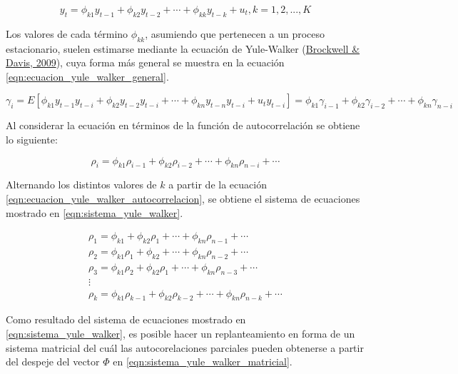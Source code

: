 \documentclass[
]{article}
\begin{document}
\begin{equation}
\label{eqn:ecuacion_autocorrelaciones}
y_t=\phi_{k1}y_{t-1}+\phi_{k2}y_{t-2}+\cdots+\phi_{kk}y_{t-k}+u_t,k=1,2,...,K
\end{equation}

Los valores de cada término \(\phi_{kk}\), asumiendo que pertenecen a un
proceso estacionario, suelen estimarse mediante la ecuación de
Yule-Walker (\protect\hyperlink{ref-yule.walker}{Brockwell \& Davis,
2009}), cuya forma más general se muestra en la ecuación
\ref{eqn:ecuacion_yule_walker_general}.

\begin{equation}
\label{eqn:ecuacion_yule_walker_general}
\gamma_i=E\left[ \phi_{k1}y_{t-1}y_{t-i} + \phi_{k2}y_{t-2}y_{t-i} + \cdots + \phi_{kn}y_{t-n}y_{t-i} + u_ty_{t-i} \right]=\phi_{k1}\gamma_{i-1} + \phi_{k2}\gamma_{i-2} + \cdots + \phi_{kn}\gamma_{n-i}
\end{equation}

Al considerar la ecuación en términos de la función de autocorrelación
se obtiene lo siguiente:

\begin{equation}
\label{eqn:ecuacion_yule_walker_autocorrelacion}
\rho_i=\phi_{k1}\rho_{i-1} + \phi_{k2}\rho_{i-2} + \cdots + \phi_{kn}\rho_{n-i}+\cdots
\end{equation}

Alternando los distintos valores de \(k\) a partir de la ecuación
\ref{eqn:ecuacion_yule_walker_autocorrelacion}, se obtiene el sistema de
ecuaciones mostrado en \ref{eqn:sistema_yule_walker}.

\begin{equation}
\label{eqn:sistema_yule_walker}
\begin{array}{lll} 
\rho_1=\phi_{k1} + \phi_{k2}\rho_{1} + \cdots + \phi_{kn}\rho_{n-1}+\cdots \\
\rho_2=\phi_{k1}\rho_{1} + \phi_{k2} + \cdots + \phi_{kn}\rho_{n-2}+\cdots \\
\rho_3=\phi_{k1}\rho_{2} + \phi_{k2}\rho_{1} + \cdots + \phi_{kn}\rho_{n-3}+\cdots \\
\vdots \\
\rho_k=\phi_{k1}\rho_{k-1} + \phi_{k2}\rho_{k-2} + \cdots + \phi_{kn}\rho_{n-k}+\cdots
\end{array}
\end{equation}

Como resultado del sistema de ecuaciones mostrado en
\ref{eqn:sistema_yule_walker}, es posible hacer un replanteamiento en
forma de un sistema matricial del cuál las autocorelaciones parciales
pueden obtenerse a partir del despeje del vector \(\Phi\) en
\ref{eqn:sistema_yule_walker_matricial}.
\end{document}
